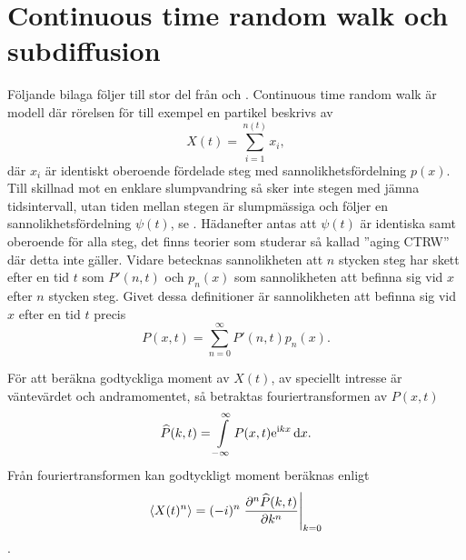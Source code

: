 \newcommand{\Pk}{\widehat{P}}
\newcommand{\Pks}{\widetilde{\widehat{P}}}
\newcommand{\pk}{\hat{p}}
\newcommand{\PPs}{\widetilde{P'}}
\newcommand{\psis}{\widetilde{\psi}}
\newcommand{\PSIs}{\widetilde{\Psi}}


\chapter{Continuous time random walk och subdiffusion}
\label{app:CTRW} 
Följande bilaga följer till stor del från \cite{Chu_2003} och \cite{Vahey_2006}. Continuous time random walk är modell där rörelsen för till exempel en partikel beskrivs av 
\begin{equation}
    X(t) = \sum_{i=1}^{n(t)} x_i,
\end{equation}
där $x_i$ är identiskt oberoende fördelade steg med sannolikhetsfördelning $p(x)$. Till skillnad mot en enklare slumpvandring så sker inte stegen med jämna tidsintervall, utan tiden mellan stegen är slumpmässiga och följer en sannolikhetsfördelning $\psi (t)$, se . Hädanefter antas att $\psi(t)$ är identiska samt oberoende för alla steg, det finns teorier som studerar så kallad ''aging CTRW''\cite{Barkai_ACTRW2002} där detta inte gäller. Vidare betecknas sannolikheten att $n$ stycken steg har skett efter en tid $t$ som $P'(n,t)$ och $p_n(x)$ som sannolikheten att befinna sig vid $x$ efter $n$ stycken steg. Givet dessa definitioner är sannolikheten att befinna sig vid $x$ efter en tid $t$ precis 
\begin{equation}
\label{eq:P(x,t)}
    P(x,t) =\sum_{n=0}^{\infty} P'(n,t)p_n(x).
\end{equation}

För att beräkna godtyckliga moment av $X(t)$, av speciellt intresse är väntevärdet och andramomentet, så betraktas fouriertransformen av $P(x,t)$
\begin{equation}\label{eq:four}
\Pk (k,t) = \int_{-\infty}^{\infty} P(x,t)\ee^{\ii kx}\id{x}.
\end{equation}
Från fouriertransformen kan godtyckligt moment beräknas enligt 
\begin{equation}\label{eq:moment}
\ev{X(t)^n} = (-i)^n \eval{\frac{\pd^n \Pk (k,t)}{\pd k^n}}_{k=0}
\end{equation}. 

